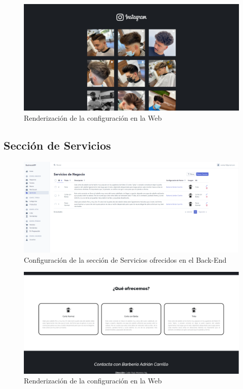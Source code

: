 \begin{figure}[H]
  \centering
  \includegraphics[scale=0.2]{images/front-end-social.png}
  \caption{Renderización de la configuración en la Web}
  \label{}
\end{figure}

\subsection{Sección de Servicios}

\begin{figure}[H]
  \centering
  \includegraphics[scale=0.2]{images/back-end-services.png}
  \caption{Configuración de la sección de Servicios ofrecidos en el Back-End}
  \label{}
\end{figure}

\begin{figure}[H]
  \centering
  \includegraphics[scale=0.2]{images/front-end-services.png}
  \caption{Renderización de la configuración en la Web}
  \label{}
\end{figure}

